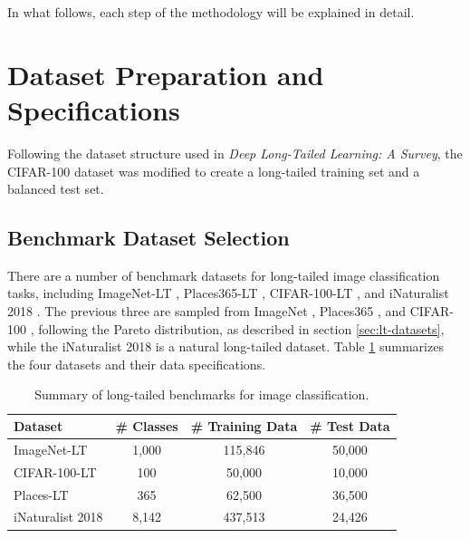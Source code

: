 In what follows, each step of the methodology will be explained in detail.

\section{Dataset Preparation and Specifications}
\label{sec:dataset_specs}
Following the dataset structure used in \textit{Deep Long-Tailed Learning: A Survey}, the CIFAR-100 dataset was modified to create a long-tailed training set and a balanced test set. 

\subsection{Benchmark Dataset Selection}
There are a number of benchmark datasets for long-tailed image classification tasks, including ImageNet-LT \cite{liu2019largescalelongtailedrecognitionopen}, Places365-LT \cite{liu2019largescalelongtailedrecognitionopen}, CIFAR-100-LT \cite{cao2019learningimbalanceddatasetslabeldistributionaware}, and iNaturalist 2018 \cite{vanhorn2018inaturalistspeciesclassificationdetection}. The previous three are sampled from ImageNet \cite{ImageNet2009}, Places365 \cite{Places365}, and CIFAR-100 \cite{krizhevsky2009learning}, following the Pareto distribution, as described in section \ref{sec:lt-datasets}, while the iNaturalist 2018 \cite{vanhorn2018inaturalistspeciesclassificationdetection} is a natural long-tailed dataset. Table \ref{tab:datasets} summarizes the four datasets and their data specifications. 

\begin{table}[ht]
    \centering
    \caption{Summary of long-tailed benchmarks for image classification.}
    \begin{tabular}{lccc}
    \hline
    \textbf{Dataset}           & \textbf{\# Classes} & \textbf{\# Training Data} & \textbf{\# Test Data} \\ \hline
    ImageNet-LT \cite{liu2019largescalelongtailedrecognitionopen}  & 1,000              & 115,846                   & 50,000                \\
    CIFAR-100-LT \cite{cao2019learningimbalanceddatasetslabeldistributionaware}  & 100                & 50,000                    & 10,000                \\
    Places-LT  \cite{liu2019largescalelongtailedrecognitionopen}   & 365                & 62,500                    & 36,500                \\
    iNaturalist 2018 \cite{vanhorn2018inaturalistspeciesclassificationdetection} & 8,142            & 437,513                   & 24,426                \\ \hline
    \end{tabular}
    \label{tab:datasets}
\end{table}
    

